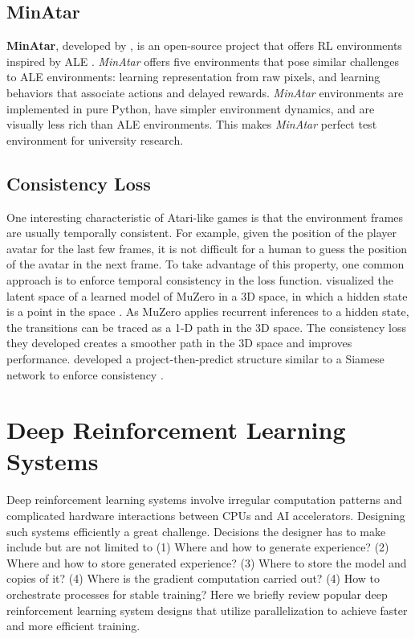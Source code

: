 \subsection{MinAtar} \label{sec:min_atar}
\textbf{MinAtar}, developed by \citeauthor{MinAtarAtariInspiredTestbed_Young.Tian_2019}, is an open-source project that offers RL environments inspired by ALE \cite{MinAtarAtariInspiredTestbed_Young.Tian_2019}.
\textit{MinAtar} offers five environments that pose similar challenges to ALE environments: learning representation from raw pixels, and learning behaviors that associate actions and delayed rewards.
\textit{MinAtar} environments are implemented in pure Python, have simpler environment dynamics, and are visually less rich than ALE environments.
This makes \textit{MinAtar} perfect test environment for university research.

\subsection{Consistency Loss}
One interesting characteristic of Atari-like games is that the environment frames are usually temporally consistent.
For example, given the position of the player avatar for the last few frames, it is not difficult for a human to guess the position of the avatar in the next frame.
To take advantage of this property, one common approach is to enforce temporal consistency in the loss function.
 visualized the latent space of a learned model of MuZero in a 3D space, in which a hidden state is a point in the space \cite{VisualizingMuZeroModels_deVries.Voskuil.ea_2021}.
As MuZero applies recurrent inferences to a hidden state, the transitions can be traced as a 1-D path in the 3D space.
The consistency loss they developed creates a smoother path in the 3D space and improves performance.
 developed a project-then-predict structure similar to a Siamese network to enforce consistency \cite{MasteringAtariGames_Ye.Liu.ea_2021,SiameseNeuralNetworks_Koch.Zemel.ea_2015}.

\section{Deep Reinforcement Learning Systems} \label{sec:drl_systems}
Deep reinforcement learning systems involve irregular computation patterns and complicated hardware interactions between CPUs and AI accelerators.
Designing such systems efficiently a great challenge.
Decisions the designer has to make include but are not limited to (1) Where and how to generate experience? (2) Where and how to store generated experience? (3) Where to store the model and copies of it? (4) Where is the gradient computation carried out? (4) How to orchestrate processes for stable training?
Here we briefly review popular deep reinforcement learning system designs that utilize parallelization to achieve faster and more efficient training.

